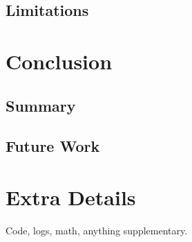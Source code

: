 \documentclass[12pt,a4paper]{report}
\begin{document}
\section{Limitations}

\chapter{Conclusion}
\section{Summary}
\section{Future Work}




\appendix
\chapter{Extra Details}
Code, logs, math, anything supplementary.
\end{document}
